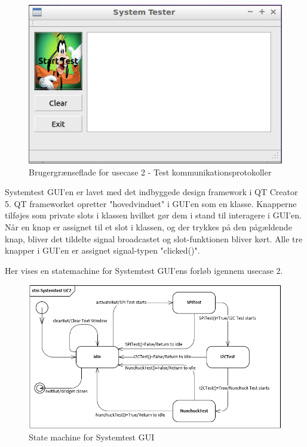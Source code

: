 \begin{figure}[H]
	\centering
	\includegraphics[width=\textwidth]{Afsnit/DesignOgImplementering/images/GUIPic}
	\caption{Brugergrænseflade for usecase 2 - Test kommunikationsprotokoller}
	\label{fig:GUIPic}
\end{figure}

Systemtest GUI'en er lavet med det indbyggede design framework i QT Creator 5.
QT frameworket opretter "hovedvinduet" i GUI'en som en klasse. Knapperne tilføjes som private slots i klassen
hvilket gør dem i stand til interagere i GUI'en. Når en knap er assignet til et slot i klassen, og der trykkes på den pågældende knap, bliver det tildelte signal broadcastet
og slot-funktionen bliver kørt. Alle tre knapper i GUI'en er assignet signal-typen "clicked()".

Her vises en statemachine for Systemtest GUI'ens forløb igennem usecase 2.

\begin{figure}[H]
	\centering
	\includegraphics[width=1.2\textwidth]{Afsnit/DesignOgImplementering/images/StateMachineUC2}
	\caption{State machine for Systemtest GUI}
	\label{fig:StateMachineUC2}
\end{figure}

